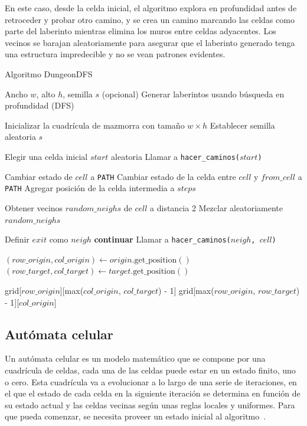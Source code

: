 En este caso, desde la celda inicial, el algoritmo explora en profundidad antes de retroceder y probar otro camino, y se crea un camino marcando las celdas como parte del laberinto mientras elimina los muros entre celdas adyacentes.
Los vecinos se barajan aleatoriamente para asegurar que el laberinto generado tenga una estructura impredecible y no se vean patrones evidentes.

\begin{algorithm}
\caption{Algoritmo DungeonDFS}
\begin{algorithmic}[1]
\Require Ancho $w$, alto $h$, semilla $s$ (opcional)
\Ensure Generar laberintos usando búsqueda en profundidad (DFS)

\State Inicializar la cuadrícula de mazmorra con tamaño $w \times h$
    \State Establecer semilla aleatoria $s$
\EndIf

\State Elegir una celda inicial $start$ aleatoria
\State Llamar a \texttt{hacer\_caminos($start$)}

    \State Cambiar estado de $cell$ a \texttt{PATH}
        \State Cambiar estado de la celda entre $cell$ y $from\_cell$ a \texttt{PATH}
        \State Agregar posición de la celda intermedia a $steps$
    \EndIf

    \State Obtener vecinos $random\_neighs$ de $cell$ a distancia 2
    \State Mezclar aleatoriamente $random\_neighs$

        \State Definir $exit$ como $neigh$
            \State \textbf{continuar}
        \EndIf
        \State Llamar a \texttt{hacer\_caminos($neigh$, $cell$)}
    \EndFor
\EndProcedure

    \State $(row\_origin, col\_origin) \gets origin.\text{get\_position}()$
    \State $(row\_target, col\_target) \gets target.\text{get\_position}()$

        \State \Return grid[$row\_origin$][max($col\_origin$, $col\_target$) - 1]
    \Else
        \State \Return grid[max($row\_origin$, $row\_target$) - 1][$col\_origin$]
    \EndIf
\EndFunction

\end{algorithmic}
\end{algorithm}



\subsection{Autómata celular}
Un autómata celular es un modelo matemático que se compone por una cuadrícula de celdas, cada una de las celdas puede estar en un estado finito, uno o cero. Esta cuadrícula va a evolucionar a lo largo de una serie de iteraciones, en el que el estado de cada celda en la siguiente iteración se determina en función de su estado actual y las celdas vecinas según unas reglas locales y uniformes. Para que pueda comenzar, se necesita proveer un estado inicial al algoritmo~\cite{cellularAutomata}.

